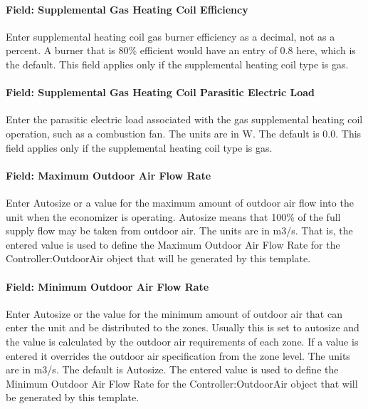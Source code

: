 \paragraph{Field: Supplemental Gas Heating Coil Efficiency}\label{field-supplemental-gas-heating-coil-efficiency-1}

Enter supplemental heating coil gas burner efficiency as a decimal, not as a percent. A burner that is 80\% efficient would have an entry of 0.8 here, which is the default. This field applies only if the supplemental heating coil type is gas.

\paragraph{Field: Supplemental Gas Heating Coil Parasitic Electric Load}\label{field-supplemental-gas-heating-coil-parasitic-electric-load-1}

Enter the parasitic electric load associated with the gas supplemental heating coil operation, such as a combustion fan. The units are in W. The default is 0.0. This field applies only if the supplemental heating coil type is gas.

\paragraph{Field: Maximum Outdoor Air Flow Rate}\label{field-maximum-outdoor-air-flow-rate-1}

Enter Autosize or a value for the maximum amount of outdoor air flow into the unit when the economizer is operating. Autosize means that 100\% of the full supply flow may be taken from outdoor air. The units are in m3/s. That is, the entered value is used to define the Maximum Outdoor Air Flow Rate for the Controller:OutdoorAir object that will be generated by this template.

\paragraph{Field: Minimum Outdoor Air Flow Rate}\label{field-minimum-outdoor-air-flow-rate-1}

Enter Autosize or the value for the minimum amount of outdoor air that can enter the unit and be distributed to the zones. Usually this is set to autosize and the value is calculated by the outdoor air requirements of each zone. If a value is entered it overrides the outdoor air specification from the zone level. The units are in m3/s. The default is Autosize. The entered value is used to define the Minimum Outdoor Air Flow Rate for the Controller:OutdoorAir object that will be generated by this template.

